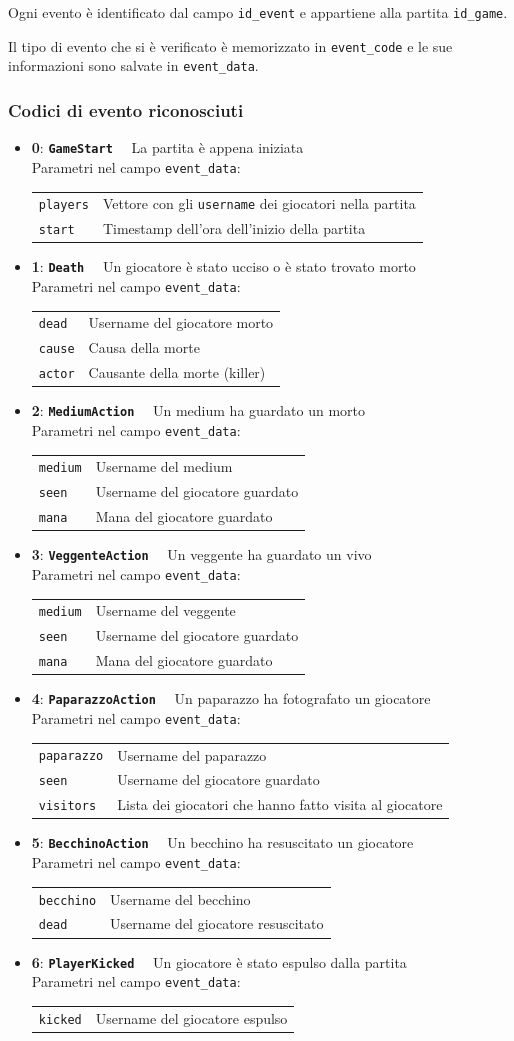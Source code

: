\documentclass[10pt,a4paper]{article}
\newcommand{\eventcode}[4]{
\textbf{#1}: \textbf{\texttt{#2}}$\quad$ #3 \\
Parametri nel campo \texttt{event\_data}: \\
\begin{tabular}{ll}
#4
\end{tabular}
}
\begin{document}
Ogni evento è identificato dal campo \texttt{id\_event} e appartiene alla partita \texttt{id\_game}.

Il tipo di evento che si è verificato è memorizzato in \texttt{event\_code} e le sue informazioni sono salvate in \texttt{event\_data}.

\subsubsection*{Codici di evento riconosciuti}
\begin{itemize}
\item \eventcode{0}{GameStart}{La partita è appena iniziata}{
\texttt{players} & Vettore con gli \texttt{username} dei giocatori nella partita \\
\texttt{start}   & Timestamp dell'ora dell'inizio della partita
}
\item \eventcode{1}{Death}{Un giocatore è stato ucciso o è stato trovato morto}{
\texttt{dead}	& Username del giocatore morto \\
\texttt{cause}	& Causa della morte \\
\texttt{actor}	& Causante della morte (killer)
}
\item \eventcode{2}{MediumAction}{Un medium ha guardato un morto}{
\texttt{medium}	& Username del medium \\
\texttt{seen}	& Username del giocatore guardato \\
\texttt{mana}	& Mana del giocatore guardato
}
\item \eventcode{3}{VeggenteAction}{Un veggente ha guardato un vivo}{
\texttt{medium}	& Username del veggente \\
\texttt{seen}	& Username del giocatore guardato \\
\texttt{mana}	& Mana del giocatore guardato
}
\item \eventcode{4}{PaparazzoAction}{Un paparazzo ha fotografato un giocatore}{
\texttt{paparazzo}	& Username del paparazzo \\
\texttt{seen}	    & Username del giocatore guardato \\
\texttt{visitors}   & Lista dei giocatori che hanno fatto visita al giocatore
}
\item \eventcode{5}{BecchinoAction}{Un becchino ha resuscitato un giocatore}{
\texttt{becchino}	& Username del becchino \\
\texttt{dead}	    & Username del giocatore resuscitato
}
\item \eventcode{6}{PlayerKicked}{Un giocatore è stato espulso dalla partita}{
\texttt{kicked}	& Username del giocatore espulso
}
\end{itemize}

\newpage
\tableofcontents
\end{document}
